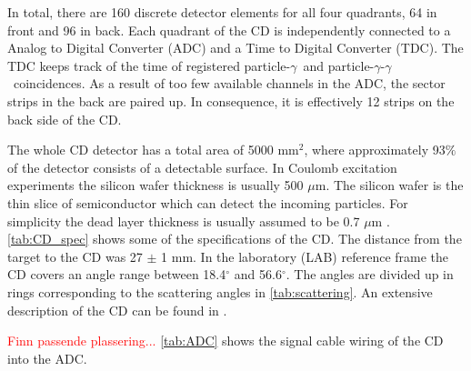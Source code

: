\documentclass[twoside,english]{uiofysmaster/uiofysmaster}
\newcommand{\ga}{$\gamma$}
\let\orgautoref\autoref
\renewcommand{\autoref}
        {%
		 \def\sectionautorefname{Section}%
		 \def\subsectionautorefname{Section}%
		 \def\subsubsectionautorefname{Section}%
		 \def\chapterautorefname{Chapter}%
          \orgautoref}
\begin{document}
In total, there are 160 discrete detector elements for all four quadrants, 64 in front and 96 in back. 
Each quadrant of the CD is independently connected to a Analog to Digital Converter (ADC) and a Time to Digital Converter (TDC). 
The TDC keeps track of the time of registered particle-\ga\ and particle-\ga-\ga\ coincidences. 
As a result of too few available channels in the ADC, the sector strips in the back are paired up.
In consequence, it is effectively 12 strips on the back side of the CD. 

The whole CD detector has a total area of 5000 mm$^2$, where approximately 93$\%$ of the detector consists of a detectable surface. 
In Coulomb excitation experiments the silicon wafer thickness is usually 500 $\mu$m.
The silicon wafer is the thin slice of semiconductor which can detect the incoming particles. 
For simplicity the dead layer thickness is usually assumed to be 0.7 $\mu$m \cite{NWarr-CD, MB-spect}. 
\autoref{tab:CD_spec} shows some of the specifications of the CD.  
The distance from the target to the CD was 27 $\pm$ 1 mm. 
In the laboratory (LAB) reference frame the CD covers an angle range between 18.4$^\circ$ and 56.6$^\circ$. 
The angles are divided up in rings corresponding to the scattering angles in \autoref{tab:scattering}.
An extensive description of the CD can be found in \cite{CD-DSSSD}.

\textcolor{red}{Finn passende plassering...}\newline
\autoref{tab:ADC} shows the signal cable wiring of the CD into the ADC. 

\end{document}
